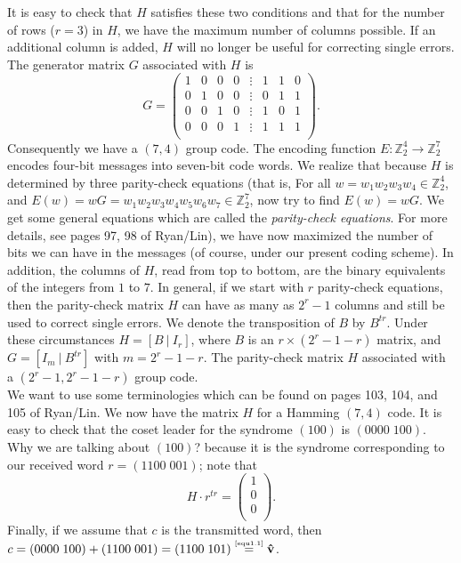 \documentclass[a4 paper]{article}
\numberwithin{equation}{section}
\newcommand{\0}{\mathbf{0}}
\begin{document}
 It is easy to check that $H$ satisfies these two conditions and that for the number of rows ($r=3$) in $H$, we have the maximum number of columns possible. If an additional column is added, $H$ will no longer be useful for correcting single errors.\\
The generator matrix $G$ associated with $H$ is
$$G=\left(
  \begin{array}{cccccccc}
    1 & 0 & 0 & 0 &\vdots & 1 & 1 & 0 \\
    0 & 1 & 0 & 0 & \vdots& 0 & 1 & 1 \\
    0 & 0 & 1 & 0 & \vdots& 1 & 0 & 1 \\
    0 & 0 & 0 & 1 &\vdots & 1 & 1 & 1 \\
  \end{array}\right).$$
  Consequently we have a $(7,4)$ group code. The encoding function $E:\mathbb{Z}_2^4 \rightarrow \mathbb{Z}_2^7$ encodes four-bit messages into seven-bit code words. We realize that because $H$ is determined by three parity-check equations (that is, For all $w=w_1w_2w_3w_4\in\mathbb{Z}_2^4$, and $E(w)= wG = w_1w_2w_3w_4w_5w_6w_7 \in \mathbb{Z}_2^7$, now try to find $E(w)=wG$. We get some general equations which are called the {\textit{parity-check equations}}. For more details, see pages 97, 98 of Ryan/Lin), we have now maximized the number of bits we can have in the messages (of course, under our present coding scheme). In addition, the columns of $H$, read from top to bottom, are the binary equivalents of the integers from $1$ to $7$. In general, if we start with $r$ parity-check equations, then the parity-check matrix $H$ can have as many as $2^r-1$ columns and still be used to correct single errors. We denote the transposition of $B$ by $B^{tr}$. Under these circumstances $H=[B\ | \ I_r]$, where $B$ is an $r\times (2^r-1-r)$ matrix, and $G=[I_m\ | \ B^{tr}]$ with $m=2^r-1-r$. The parity-check matrix $H$ associated with a $(2^r-1, 2^r-1-r)$ group code. \\
  We want to use some terminologies which can be found on pages 103, 104, and 105 of Ryan/Lin. We now have the matrix $H$ for a Hamming $(7,4)$ code. It is easy to check that the coset leader for the syndrome $(100)$ is $(0000 \; 100)$. Why we are talking about  $(100)$? because it is the syndrome corresponding to our received word $r=(1100 \; 001)$; note that
  $$H \cdot r^{tr}=
  \left(
    \begin{array}{c}
      1 \\
      0 \\
      0 \\
    \end{array}
  \right).$$
  Finally, if we assume that $c$ is the transmitted word, then $c=(0000 \; 100)+(1100 \; 001)= (1100 \; 101)\stackrel{\text{\tiny\ref{equ1.1}}}{=} \bf\hat{v}$. \\


%
%
%
%
%
\end{document}
